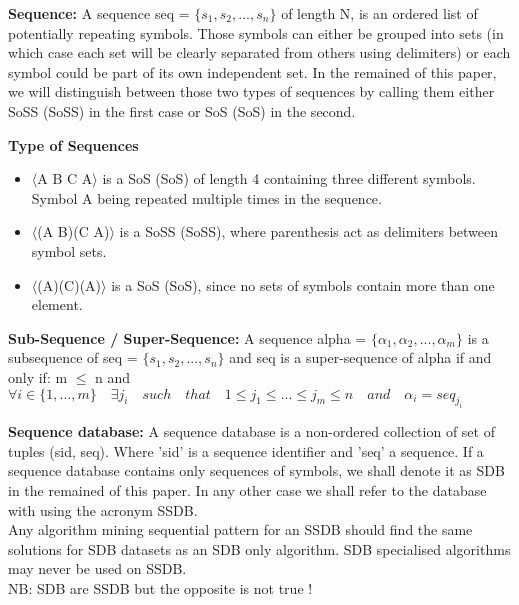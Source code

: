 \documentclass{eplmastersthesis}
\begin{document}
\begin{definition}{\bfseries Sequence:}
A sequence seq = $\{s_1, s_2, ..., s_n\}$ of length N, is an ordered list of potentially repeating symbols. Those symbols can either be grouped into sets (in which case each set will be clearly separated from others using delimiters) or each symbol could be part of its own independent set. In the remained of this paper, we will distinguish between those two types of sequences by calling them either \acrlong{SoSS} (\acrshort{SoSS}) in the first case or \acrlong{SoS} (\acrshort{SoS}) in the second.
\end{definition}

\begin{example}{\bfseries Type of Sequences}
\begin{itemize}
\item $\langle$A B C A$\rangle$ is a \acrlong{SoS} (\acrshort{SoS}) of length 4 containing three different symbols. Symbol A being repeated multiple times in the sequence.
\item $\langle$(A B)(C A)$\rangle$ is a \acrlong{SoSS} (\acrshort{SoSS}), where parenthesis act as delimiters between symbol sets.
\item $\langle$(A)(C)(A)$\rangle$ is a \acrlong{SoS} (\acrshort{SoS}), since no sets of symbols contain more than one element.
\end{itemize}
\end{example}

\begin{definition}{\bfseries Sub-Sequence / Super-Sequence:}
A sequence alpha = $\{\alpha_1, \alpha_2, ..., \alpha_m\}$ is a subsequence of seq = $\{s_1, s_2, ..., s_n\}$ and seq is a super-sequence of alpha if and only if: m $\leq$ n and $\forall i \in \{1, ..., m\} \quad \exists j_i \quad such \quad that \quad 1 \leq j_1 \leq ... \leq j_m \leq n \quad and \quad \alpha_i = seq_{j_i}$
\end{definition}

\begin{definition}{\bfseries Sequence database:}
A sequence database is a non-ordered collection of set of tuples (sid, seq). Where 'sid' is a sequence identifier and 'seq' a sequence. If a sequence database contains only sequences of symbols, we shall denote it as SDB in the remained of this paper. In any other case we shall refer to the database with using the acronym SSDB. \\
Any algorithm mining sequential pattern for an SSDB should find the same solutions for SDB datasets as an SDB only algorithm. SDB specialised algorithms may never be used on SSDB. \\
NB: SDB are SSDB but the opposite is not true ! 
\end{definition}
\end{document}
